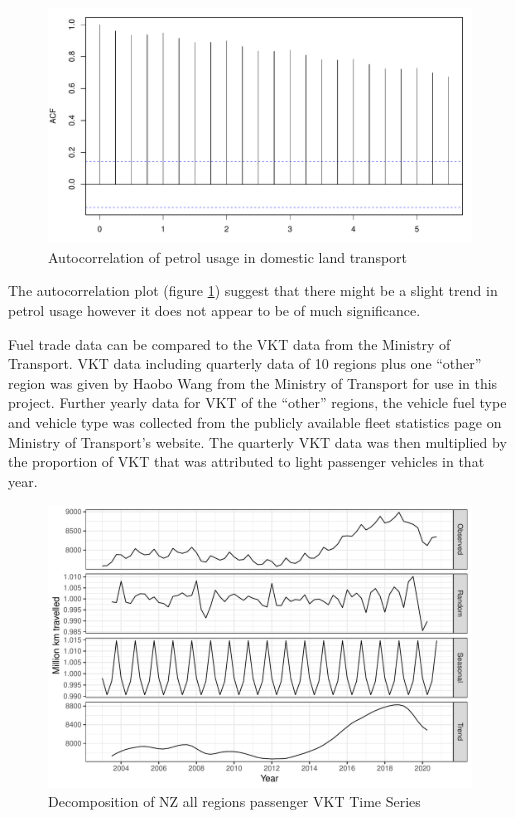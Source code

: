 \documentclass[
]{article}
\begin{document}
\begin{figure}
\centering
\includegraphics{mixed_model_files/figure-latex/acf_petrol-1.pdf}
\caption{Autocorrelation of petrol usage in domestic land
transport\label{fig:acf_petrol}}
\end{figure}

The autocorrelation plot (figure \ref{fig:acf_petrol}) suggest that
there might be a slight trend in petrol usage however it does not appear
to be of much significance.

Fuel trade data can be compared to the VKT data from the Ministry of
Transport. VKT data including quarterly data of 10 regions plus one
``other'' region was given by Haobo Wang from the Ministry of Transport
for use in this project. Further yearly data for VKT of the ``other''
regions, the vehicle fuel type and vehicle type was collected from the
publicly available fleet statistics page on Ministry of Transport's
website. The quarterly VKT data was then multiplied by the proportion of
VKT that was attributed to light passenger vehicles in that year.

\begin{figure}
\centering
\includegraphics{mixed_model_files/figure-latex/VKT_ts-1.pdf}
\caption{Decomposition of NZ all regions passenger VKT Time
Series\label{fig:VKT_ts}}
\end{figure}
\end{document}
